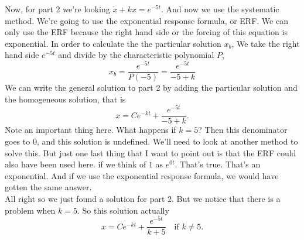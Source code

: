 Now, for part 2 we're looking $\dot{x} + kx = e^{-5t}$.
And now we use the systematic method.
We're going to use the exponential response formula, or ERF.
We can only use the ERF because the right hand side or the forcing of this equation is exponential.
In order to calculate the the particular solution $x_b$,
We take the right hand side $e^{-5t}$ and divide by the characteristic polynomial $P$,
\begin{equation*}
  x_b = \frac{e^{-5t}}{P(-5)} = \frac{e^{-5t}}{-5 + k}  
\end{equation*}
We can write the general solution to part 2 by adding the particular solution
and the homogeneous solution, that is 
\begin{equation*}
  x = C e^{-kt} + \frac{e^{-5t}}{-5 + k}. 
\end{equation*}
Note an important thing here. What happens if $k = 5$?
Then this denominator goes to $0$, and this solution is undefined.
We'll need to look at another method to solve this.
But just one last thing that I want to point out is that the ERF could also have been used here. 
if we think of $1$ as $e^{0t}$.
That's true. That's an exponential.
And if we use the exponential response formula,
we would have gotten the same answer.\\

All right so we just found a solution for part 2.
But we notice that there is a problem when $k = 5$.
So this solution actually
\begin{equation*}
  x = C e^{-kt} + \frac{e^{-5t}}{k + 5} \quad \text{if } k \ne 5.   
\end{equation*}

